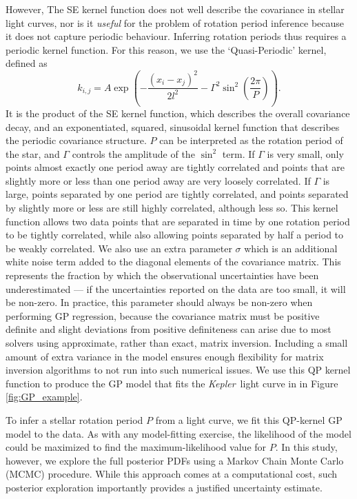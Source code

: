 \documentclass[useAMS, usenatbib, preprint, 12pt]{aastex}
\newcommand{\Kepler}{{\it Kepler}}
\begin{document}
However, The SE kernel function does not well describe the covariance 
in stellar light curves, nor is it {\it useful} for the problem of 
rotation period inference because it does not capture periodic behaviour.
Inferring rotation periods thus requires a periodic kernel
function.  For this reason, we use the `Quasi-Periodic' kernel, defined as
\begin{equation}
k_{i,j} = A \exp \left(-\frac{(x_i - x_j)^2}{2l^2} -
\Gamma^2 \sin^2(\frac{2\pi}{P}) \right).
\end{equation}
\label{eq:QP}
It is the product of the SE kernel function, which describes the overall
covariance decay, and an exponentiated, squared, sinusoidal kernel function
that describes the periodic covariance structure.
$P$ can be interpreted as the rotation period of the star, and $\Gamma$
controls the amplitude of the $\sin^2$ term.
If $\Gamma$ is very small, only points almost exactly one period away are
tightly correlated and points that are slightly more or less than one period
away are very loosely correlated.
If $\Gamma$ is large, points separated by one period are tightly
correlated, and points separated by slightly more or less are still highly
correlated, although less so.
This kernel function allows two data points that are separated in time by one
rotation period to be tightly correlated, while also allowing 
points separated by half a period to be weakly correlated.
We also use an extra parameter $\sigma$ which is an additional white noise
term added to the diagonal elements of the covariance matrix.
This represents the fraction by which the observational uncertainties have been
underestimated --- if the uncertainties reported on the data are too small,
it will be non-zero.
In practice, this parameter should always be non-zero when performing
GP regression, because the covariance matrix must be positive definite and  
slight deviations from positive definiteness can arise due to most 
solvers using approximate, rather than exact, matrix inversion.
Including a small amount of extra variance in the model ensures enough
flexibility for matrix inversion algorithms to not run into such numerical
issues.  We use this QP kernel function to produce the GP model 
that fits the \Kepler\ light curve in in Figure \ref{fig:GP_example}.

To infer a stellar rotation period $P$ from a light curve, we fit this QP-kernel
GP model to the data.  As with any model-fitting exercise, the likelihood
of the model could be maximized to find the maximum-likelihood value for $P$.
In this study, however, we explore the full posterior PDFs using a Markov
Chain Monte Carlo (MCMC) procedure.  While
this approach comes at a computational cost, such posterior exploration 
importantly provides a justified uncertainty estimate.
\end{document}
